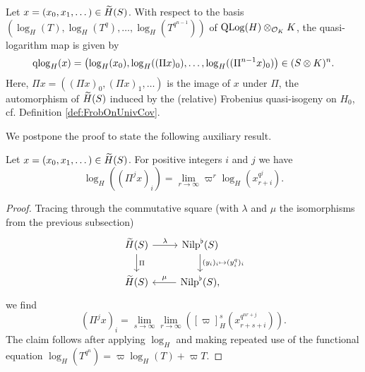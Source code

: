 \documentclass[../main.tex]{subfiles}
\begin{document}
\begin{prop}\label{prop:qlogmapExplicit}
  Let $x = (x_0, x_1, \dots) \in \Tilde H(S)$. With respect to the basis
  $(\log_H(T),\allowbreak \log_H(T^q), \allowbreak \dots, \allowbreak \log_H(T^{q^{n-1}}))$ of 
  $\QLog(H) \otimes_{\cO_K} K$, the quasi-logarithm map is given by
  \begin{equation*}
    \qlog_H(x) = \left(\log_H(x_0), \log_H((\Pi x)_0), \dots, \log_H((\Pi^{n-1}
    x)_0)\right) \in (S\otimes K)^n.
  \end{equation*}
  Here, $\Pi x = ((\Pi x)_0, (\Pi x)_1, \dots)$ is the image of $x$ under
  $\Pi$, the automorphism of $\Tilde
  H(S)$ induced by the (relative) Frobenius quasi-isogeny on $H_0$, cf. Definition
  \ref{def:FrobOnUnivCov}.
\end{prop}
We postpone the proof to state the following auxiliary result.
\begin{lem}\label{lem:FrobOnTildeHExpl}
  Let $x = (x_0 ,x_1, \dots) \in \Tilde H(S)$. For positive integers $i$ and
  $j$ we have
  \begin{equation*}
    \log_H((\Pi^j x)_i) = \lim_{r \to \infty} \varpi^r \log_H(x_{r+i}^{q^j}).
  \end{equation*}
\begin{proof}
  Tracing through the commutative square (with $\lambda$ and $\mu$ the
  isomorphisms from the previous subsection)
    \begin{equation*}
    \begin{tikzcd}[ampersand replacement=\&]
    	{\Tilde H(S)} \& {\Nilp^\flat(S)} \\
    	{\Tilde H(S)} \& {\Nilp^\flat(S),}
    	\arrow["\lambda", from=1-1, to=1-2]
    	\arrow["\Pi", from=1-1, to=2-1]
    	\arrow["{(y_i)_i \mapsto (y_i^{q})_i}", from=1-2, to=2-2]
    	\arrow["\mu"', from=2-2, to=2-1]
    \end{tikzcd}
    \end{equation*}
    we find 
    \begin{equation} \label{eq:CompsOfPiExplicit}
      (\Pi^j x)_i = \lim_{s \to \infty} \lim_{r\to\infty} \left([\varpi]_H^s
      (x_{r+s+i}^{q^{nr + j}})\right).
    \end{equation}
    The claim follows after applying $\log_H$ and making repeated use of the
    functional equation $\log_H(T^{q^n}) = \varpi \log_H(T) + \varpi T$.
\end{proof}
\end{lem}
\end{document}
